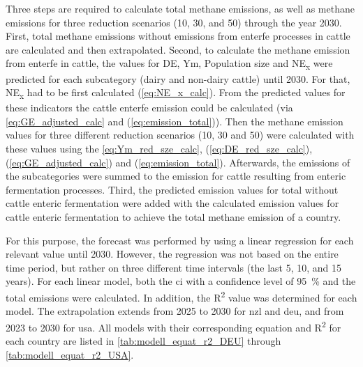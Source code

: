 Three steps are required to calculate total methane emissions, as well as methane emissions for three reduction scenarios (10, 30, and 50) through the year 2030.
First, total methane emissions without emissions from \acrfull{enterfe} processes in cattle are calculated and then extrapolated.
Second, to calculate the methane emission from \acrshort{enterfe} in cattle, the values for DE, Ym, Population size and NE\textsubscript{x} were predicted for each subcategory (dairy and non-dairy cattle) until 2030. For that, NE\textsubscript{x} had to be first calculated (\cref{eq:NE_x_calc}). From the predicted values for these indicators the cattle \acrshort{enterfe}  emission could be calculated (via \cref{eq:GE_adjusted_calc} and (\ref{eq:emission_total})).
Then the methane emission values for three different reduction scenarios (10, 30 and 50) were calculated with these values using the \cref{eq:Ym_red_sze_calc}, (\ref{eq:DE_red_sze_calc}), (\ref{eq:GE_adjusted_calc}) and (\ref{eq:emission_total}).
Afterwards, the emissions of the subcategories were summed to the  emission for cattle resulting from enteric fermentation processes.
Third, the predicted emission values for total without cattle enteric fermentation were added with the calculated emission values for cattle enteric fermentation to achieve the total methane emission of a country.

For this purpose, the forecast was performed by using a linear regression for each relevant value until 2030. However, the regression was not based on the entire time period, but rather on three different time intervals (the last 5, 10, and 15 years). For each linear model, both the \acrfull{ci} with a confidence level of 95~\% and the total emissions were calculated. In addition, the R\textsuperscript{2} value was determined for each model.
The extrapolation extends from 2025 to 2030 for \acrshort{nzl} and \acrshort{deu}, and from 2023 to 2030 for \acrshort{usa}. All models with their corresponding equation and R\textsuperscript{2} for each country are listed in \cref{tab:modell_equat_r2_DEU} through \cref{tab:modell_equat_r2_USA}.
